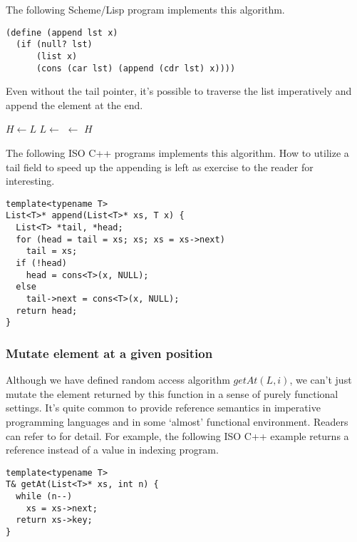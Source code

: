 \documentclass{article}
\begin{document}
The following Scheme/Lisp program implements this algorithm.

\lstset{language=Lisp}
\begin{lstlisting}
(define (append lst x)
  (if (null? lst) 
      (list x) 
      (cons (car lst) (append (cdr lst) x))))
\end{lstlisting}

Even without the tail pointer, it's possible to traverse the list imperatively and append the element at the end.

\begin{algorithmic}
    \State \Return {}
  \EndIf
  \State $H \gets L$
    \State $L \gets$ 
  \EndWhile
  \State {} $\gets$ 
  \State \Return $H$
\EndFunction
\end{algorithmic}

The following ISO C++ programs implements this algorithm. How to utilize a tail field to speed up the appending
is left as exercise to the reader for interesting.

\lstset{language=C++}
\begin{lstlisting}
template<typename T>
List<T>* append(List<T>* xs, T x) {
  List<T> *tail, *head;
  for (head = tail = xs; xs; xs = xs->next)
    tail = xs;
  if (!head)
    head = cons<T>(x, NULL);
  else
    tail->next = cons<T>(x, NULL);
  return head;
}
\end{lstlisting}

\subsubsection{Mutate element at a given position}
Although we have defined random access algorithm $getAt(L, i)$, we can't just mutate the element returned
by this function in a sense of purely functional settings. It's quite common to provide reference semantics
in imperative programming languages and in some `almost' functional environment. Readers can refer to \cite{mittype}
for detail. For example, the following ISO C++ example returns a reference instead of a value in indexing program.

\lstset{language=C++}
\begin{lstlisting}
template<typename T>
T& getAt(List<T>* xs, int n) {
  while (n--)
    xs = xs->next;
  return xs->key;
}
\end{lstlisting}
\end{document}
